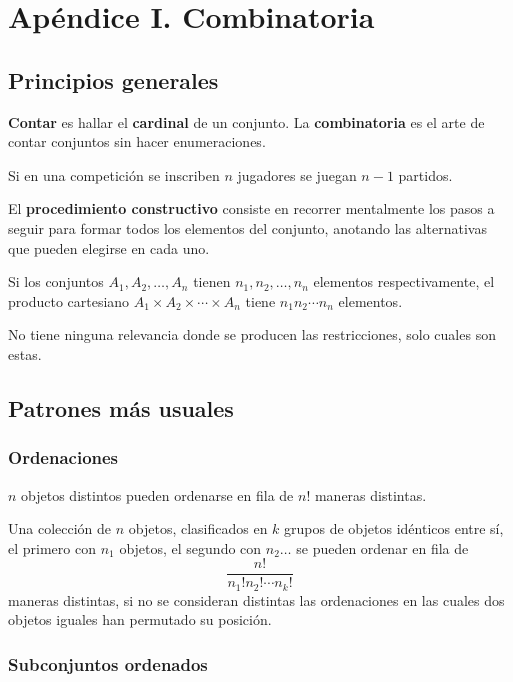 \chapter{Apéndice I. Combinatoria} 

\section{Principios generales} 

\textbf{Contar} es hallar el \textbf{cardinal} de un conjunto. La \textbf{combinatoria} es el arte de contar conjuntos sin hacer enumeraciones.

Si en una competición se inscriben \(n\) jugadores se juegan \(n-1\) partidos.

El \textbf{procedimiento constructivo} consiste en recorrer mentalmente los pasos a seguir para formar todos los elementos del conjunto,
anotando las alternativas que pueden elegirse en cada uno. 

Si los conjuntos \(A_1, A_2, \ldots, A_n\) tienen \(n_1, n_2,\ldots, n_n\) elementos respectivamente, el producto cartesiano \(A_1 \times A_2 \times \cdots \times A_n\) tiene
\(n_1n_2\cdots n_n\) elementos.

No tiene ninguna relevancia donde se producen las restricciones, solo cuales son estas.

\section{Patrones más usuales}
\label{patrones-muxe1s-usuales}

\subsection{Ordenaciones}
\label{ordenaciones}

\(n\) objetos distintos pueden ordenarse en fila de \(n!\) maneras distintas.

Una colección de \(n\) objetos, clasificados en \(k\) grupos de objetos idénticos entre sí, el primero con \(n_1\) objetos, el segundo con \(n_2\ldots\) se pueden ordenar en fila de
\[
\frac{n!}{n_1!n_2!\cdots n_k!}
\] 
maneras distintas, si no se consideran distintas las ordenaciones en las cuales dos objetos iguales han permutado su posición. 

\subsection{Subconjuntos ordenados} 


